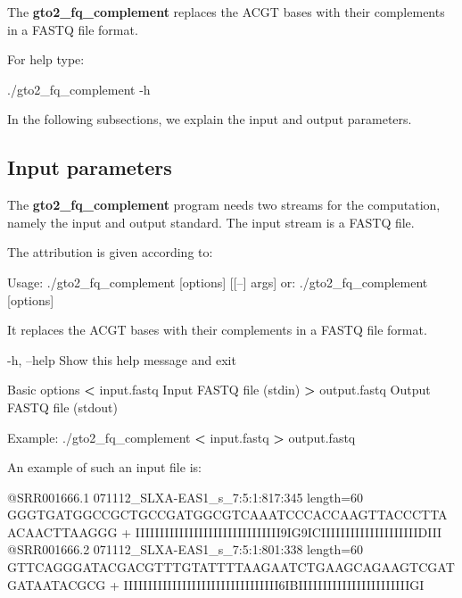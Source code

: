 \documentclass[11pt,]{krantz}
\newenvironment{Shaded}{\begin{snugshade}}{\end{snugshade}}
\newcommand{\FunctionTok}[1]{\textcolor[rgb]{0,0,0}{#1}}
\newcommand{\OperatorTok}[1]{\textcolor[rgb]{0.43,0.43,0.43}{\textbf{#1}}}
\newcommand{\ExtensionTok}[1]{#1}
\newcommand{\NormalTok}[1]{#1}
\begin{document}
The \textbf{gto2\_fq\_complement} replaces the ACGT bases with their
complements in a FASTQ file format.

For help type:

\begin{Shaded}
\begin{Highlighting}[]
\ExtensionTok{./gto2_fq_complement}\NormalTok{ -h}
\end{Highlighting}
\end{Shaded}

In the following subsections, we explain the input and output
parameters.

\subsection*{Input parameters}\label{input-parameters-21}


The \textbf{gto2\_fq\_complement} program needs two streams for the
computation, namely the input and output standard. The input stream is a
FASTQ file.

The attribution is given according to:

\begin{Shaded}
\begin{Highlighting}[]
\ExtensionTok{Usage}\NormalTok{: ./gto2_fq_complement [options] [[--] args]}
   \ExtensionTok{or}\NormalTok{: ./gto2_fq_complement [options]}

\ExtensionTok{It}\NormalTok{ replaces the ACGT bases with their complements in a FASTQ}
\FunctionTok{file}\NormalTok{ format.}

    \ExtensionTok{-h}\NormalTok{, --help            Show this help message and exit}

\ExtensionTok{Basic}\NormalTok{ options}
    \OperatorTok{<} \ExtensionTok{input.fastq}\NormalTok{         Input FASTQ file (stdin)}
    \OperatorTok{>} \ExtensionTok{output.fastq}\NormalTok{        Output FASTQ file (stdout)}

\ExtensionTok{Example}\NormalTok{: ./gto2_fq_complement }\OperatorTok{<}\NormalTok{ input.fastq }\OperatorTok{>}\NormalTok{ output.fastq}
\end{Highlighting}
\end{Shaded}

An example of such an input file is:

\begin{Shaded}
\begin{Highlighting}[]
\ExtensionTok{@SRR001666.1}\NormalTok{ 071112_SLXA-EAS1_s_7:5:1:817:345 length=60}
\ExtensionTok{GGGTGATGGCCGCTGCCGATGGCGTCAAATCCCACCAAGTTACCCTTAACAACTTAAGGG}
\ExtensionTok{+}
\ExtensionTok{IIIIIIIIIIIIIIIIIIIIIIIIIIIIII9IG9ICIIIIIIIIIIIIIIIIIIIIDIII}
\ExtensionTok{@SRR001666.2}\NormalTok{ 071112_SLXA-EAS1_s_7:5:1:801:338 length=60}
\ExtensionTok{GTTCAGGGATACGACGTTTGTATTTTAAGAATCTGAAGCAGAAGTCGATGATAATACGCG}
\ExtensionTok{+}
\ExtensionTok{IIIIIIIIIIIIIIIIIIIIIIIIIIIIIIII6IBIIIIIIIIIIIIIIIIIIIIIIIGI}
\end{Highlighting}
\end{Shaded}
\end{document}
